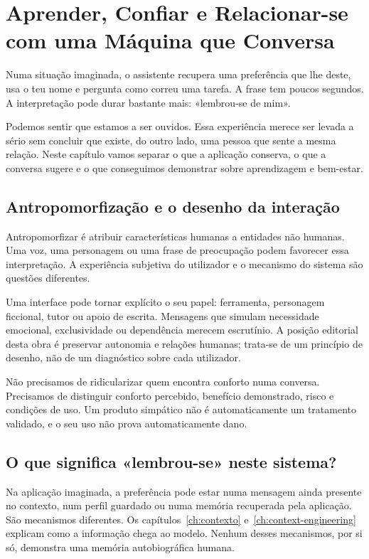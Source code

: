 \chapter{Aprender, Confiar e Relacionar-se com uma Máquina que Conversa}
\label{ch:relacoes}

Numa situação imaginada, o assistente recupera uma preferência que lhe deste, usa o teu nome e pergunta como correu uma tarefa. A frase tem poucos segundos. A interpretação pode durar bastante mais: «lembrou-se de mim».

Podemos sentir que estamos a ser ouvidos. Essa experiência merece ser levada a sério sem concluir que existe, do outro lado, uma pessoa que sente a mesma relação. Neste capítulo vamos separar o que a aplicação conserva, o que a conversa sugere e o que conseguimos demonstrar sobre aprendizagem e bem-estar.

\section{Antropomorfização e o desenho da interação}
Antropomorfizar é atribuir características humanas a entidades não humanas. Uma voz, uma personagem ou uma frase de preocupação podem favorecer essa interpretação. A experiência subjetiva do utilizador e o mecanismo do sistema são questões diferentes.

Uma interface pode tornar explícito o seu papel: ferramenta, personagem ficcional, tutor ou apoio de escrita. Mensagens que simulam necessidade emocional, exclusividade ou dependência merecem escrutínio. A posição editorial desta obra é preservar autonomia e relações humanas; trata-se de um princípio de desenho, não de um diagnóstico sobre cada utilizador.

Não precisamos de ridicularizar quem encontra conforto numa conversa. Precisamos de distinguir conforto percebido, benefício demonstrado, risco e condições de uso. Um produto simpático não é automaticamente um tratamento validado, e o seu uso não prova automaticamente dano.

\section{O que significa «lembrou-se» neste sistema?}
Na aplicação imaginada, a preferência pode estar numa mensagem ainda presente no contexto, num perfil guardado ou numa memória recuperada pela aplicação. São mecanismos diferentes. Os capítulos~\ref{ch:contexto} e~\ref{ch:context-engineering} explicam como a informação chega ao modelo. Nenhum desses mecanismos, por si só, demonstra uma memória autobiográfica humana.

